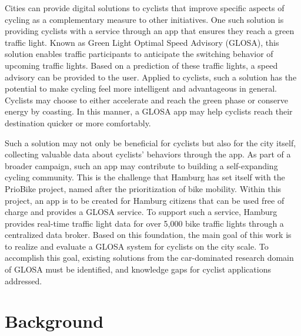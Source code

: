 Cities can provide digital solutions to cyclists that improve specific aspects of cycling as a complementary measure to other initiatives. One such solution is providing cyclists with a service through an app that ensures they reach a green traffic light. Known as Green Light Optimal Speed Advisory (GLOSA), this solution enables traffic participants to anticipate the switching behavior of upcoming traffic lights. Based on a prediction of these traffic lights, a speed advisory can be provided to the user. Applied to cyclists, such a solution has the potential to make cycling feel more intelligent and advantageous in general. Cyclists may choose to either accelerate and reach the green phase or conserve energy by coasting. In this manner, a GLOSA app may help cyclists reach their destination quicker or more comfortably.

Such a solution may not only be beneficial for cyclists but also for the city itself, collecting valuable data about cyclists' behaviors through the app. As part of a broader campaign, such an app may contribute to building a self-expanding cycling community. This is the challenge that Hamburg has set itself with the PrioBike project, named after the prioritization of bike mobility. Within this project, an app is to be created for Hamburg citizens that can be used free of charge and provides a GLOSA service. To support such a service, Hamburg provides real-time traffic light data for over 5,000 bike traffic lights through a centralized data broker. Based on this foundation, the main goal of this work is to realize and evaluate a GLOSA system for cyclists on the city scale. To accomplish this goal, existing solutions from the car-dominated research domain of GLOSA must be identified, and knowledge gaps for cyclist applications addressed. 

\section{Background}

